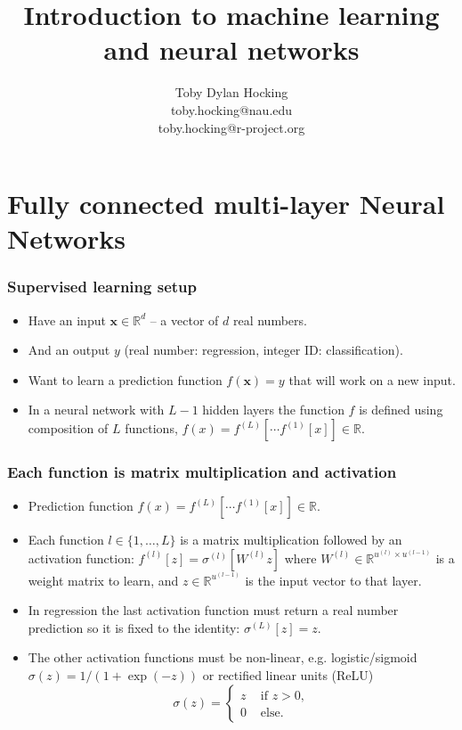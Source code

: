 \documentclass{beamer}
\begin{document}
\title{Introduction to machine learning and neural networks}

\author{
  Toby Dylan Hocking\\
  toby.hocking@nau.edu\\
  toby.hocking@r-project.org\\
}

\maketitle


\section{Fully connected multi-layer Neural Networks}

\begin{frame}
  \frametitle{Supervised learning setup}
  \begin{itemize}
  \item Have an input $\mathbf x\in\mathbb R^d$ -- a vector of $d$
    real numbers.
  \item And an output $y$ (real number: regression, integer ID:
    classification).
  \item Want to learn a prediction function $f(\mathbf x) = y$ that
    will work on a new input.
  \item In a neural network with $L-1$ hidden layers the function $f$
    is defined using composition of $L$ functions,
    $f(x)=f^{(L)}[\cdots f^{(1)}[x] ]\in\mathbb R$.
  \end{itemize}
\end{frame}

\begin{frame}
  \frametitle{Each function is matrix multiplication and activation}
  \begin{itemize}
  \item Prediction function $f(x)=f^{(L)}[\cdots f^{(1)}[x] ]\in\mathbb R$.
  \item Each function $l\in\{1,\dots, L\}$ is a matrix multiplication
    followed by an activation function:
    $f^{(l)}[z] = \sigma^{(l)}[ W^{(l)} z ]$ where
    $W^{(l)}\in\mathbb R^{u^{(l)}\times u^{(l-1)}}$ is a weight matrix
    to learn, and $z\in\mathbb R^{u^{(l-1)}}$ is the input vector to
    that layer.
\item In regression the last activation function must return
a real number prediction so it is fixed to the identity:
$\sigma^{(L)}[z]=z$.
\item The other activation functions must be
non-linear, e.g. 
logistic/sigmoid $\sigma(z)=1/(1+\exp(-z))$ or rectified linear units (ReLU) 
$$
\sigma(z)=
\begin{cases}
  z & \text{ if } z>0,\\
  0 & \text{ else.}
\end{cases}
$$ 
\end{itemize}
\end{frame}
\end{document}
